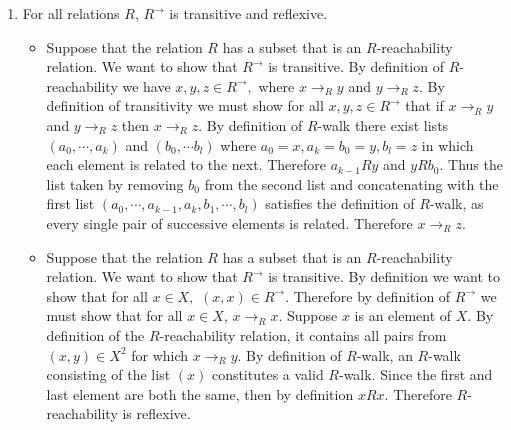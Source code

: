 \documentclass[12pt, letterpaper]{article}
\begin{document}
\begin{enumerate}
		\item For all relations $R$, $R^{\longrightarrow}$ is transitive and reflexive.  	
		\begin{itemize}
			\item Suppose that the relation $R$ has a subset that is an $R$-reachability relation. We want to show that $R^{\longrightarrow}$ is transitive.  By definition of $R$-reachability we have $x,y,z \in R^{\longrightarrow},$ where $x \longrightarrow_R y$ and $y \longrightarrow_R z$. By definition of transitivity we must show for all $x,y,z \in R^{\longrightarrow}$ that if $x \longrightarrow_R y$ and $y \longrightarrow_R z$ then $x \longrightarrow_R z$.  By definition of $R$-walk there exist lists $(a_0,\cdots,a_k)$ and $(b_0,\cdots b_l)$ where $a_0 = x, a_k = b_0 = y, b_l = z$ in which each element is related to the next.  Therefore $a_{k-1}Ry$ and $yRb_0$.  Thus the list taken by removing $b_0$ from the second list and concatenating with the first list $(a_0, \cdots, a_{k-1},a_k, b_1, \cdots, b_l)$ satisfies the definition of $R$-walk, as every single pair of successive elements is related.  Therefore $x \longrightarrow_R z.$
			\item Suppose that the relation $R$ has a subset that is an $R$-reachability relation. We want to show that $R^{\longrightarrow}$ is transitive.  By definition we want to show that for all $x \in X,$ $(x,x)\in R^{\longrightarrow}.$  Therefore by definition of $R^{\longrightarrow}$ we must show that for all $x \in X$, $x \longrightarrow_R x.$  Suppose $x$ is an element of $X$.  By definition of the $R$-reachability relation, it contains all pairs from $(x,y) \in X^2$ for which $x \longrightarrow_R y$.  By definition of $R$-walk, an $R$-walk consisting of the list $(x)$ constitutes a valid $R$-walk.  Since the first and last element are both the same, then by definition $xRx.$  Therefore $R$-reachability is reflexive.      
		\end{itemize}
	\end{enumerate}
\end{document}
